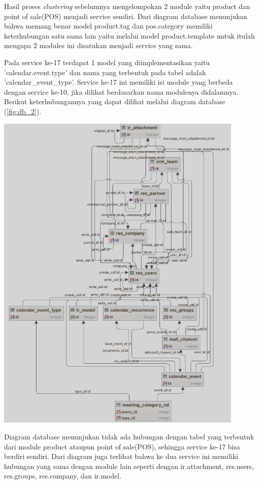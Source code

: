 Hasil proses \textit{clustering} sebelumnya mengelompokan 2 module yaitu product dan point of sale(POS) menjadi service sendiri. Dari diagram database menunjukan bahwa memang benar model product.tag dan pos.category memiliki keterhubungan satu sama lain yaitu melalui model product.template untuk itulah mengapa 2 modules ini disatukan menjadi service yang sama.  

Pada service ke-17 terdapat 1 model yang diimplementasikan yaitu  'calendar.event.type' dan nama yang terbentuk pada tabel adalah 'calendar\_event\_type'. Service ke-17 ini memiliki isi module yang berbeda dengan service ke-10, jika dilihat berdasarkan nama modulenya didalamnya. Berikut keterhubungannya yang dapat dilihat melalui diagram database (\ref{fig:db_2}).

\begin{center}
	\includegraphics[width=12cm]{img/bab_4/db_2.png}
	\label{fig:db_2}
\end{center}

Diagram database menunjukan tidak ada hubungan dengan tabel yang terbentuk dari module product ataupun point of sale(POS), sehingga service ke-17 bisa berdiri sendiri. Dari diagram juga terlihat bahwa ke dua service ini memiliki hubungan yang sama dengan module lain seperti dengan ir.attachment, res.users, res.groups, res.company, dan ir.model. 